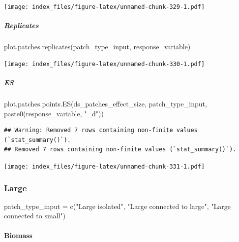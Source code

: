 \documentclass[
]{article}
\newenvironment{Shaded}{\begin{snugshade}}{\end{snugshade}}
\newcommand{\FunctionTok}[1]{\textcolor[rgb]{0.00,0.00,0.00}{#1}}
\newcommand{\NormalTok}[1]{#1}
\newcommand{\OtherTok}[1]{\textcolor[rgb]{0.56,0.35,0.01}{#1}}
\newcommand{\StringTok}[1]{\textcolor[rgb]{0.31,0.60,0.02}{#1}}
\begin{document}
\texttt{[image: index\_files/figure-latex/unnamed-chunk-329-1.pdf]}

\hypertarget{replicates}{%
\subparagraph{Replicates}\label{replicates}}

\begin{Shaded}
\begin{Highlighting}[]
\FunctionTok{plot.patches.replicates}\NormalTok{(patch\_type\_input,}
\NormalTok{                        response\_variable)}
\end{Highlighting}
\end{Shaded}

\texttt{[image: index\_files/figure-latex/unnamed-chunk-330-1.pdf]}

\hypertarget{es-8}{%
\subparagraph{ES}\label{es-8}}

\begin{Shaded}
\begin{Highlighting}[]
\FunctionTok{plot.patches.points.ES}\NormalTok{(ds\_patches\_effect\_size, patch\_type\_input,}
                       \FunctionTok{paste0}\NormalTok{(response\_variable, }\StringTok{"\_d"}\NormalTok{))}
\end{Highlighting}
\end{Shaded}

\begin{verbatim}
## Warning: Removed 7 rows containing non-finite values (`stat_summary()`).
## Removed 7 rows containing non-finite values (`stat_summary()`).
\end{verbatim}

\texttt{[image: index\_files/figure-latex/unnamed-chunk-331-1.pdf]}

\hypertarget{large}{%
\subsubsection{Large}\label{large}}

\begin{Shaded}
\begin{Highlighting}[]
\NormalTok{patch\_type\_input }\OtherTok{=} \FunctionTok{c}\NormalTok{(}\StringTok{"Large isolated"}\NormalTok{,}
                     \StringTok{"Large connected to large"}\NormalTok{,}
                     \StringTok{"Large connected to small"}\NormalTok{)}
\end{Highlighting}
\end{Shaded}

\hypertarget{biomass-6}{%
\paragraph{Biomass}\label{biomass-6}}
\end{document}
